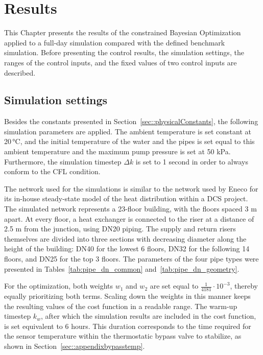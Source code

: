 \chapter{Results}
\label{chapter:Results}

This Chapter presents the results of the constrained Bayesian Optimization applied to a full-day simulation compared with the defined benchmark simulation. Before presenting the control results, the simulation settings, the ranges of the control inputs, and the fixed values of two control inputs are described.

\section{Simulation settings}
Besides the constants presented in Section~\ref{sec::physicalConstants}, the following simulation parameters are applied. The ambient temperature is set constant at 20\,°C, and the initial temperature of the water and the pipes is set equal to this ambient temperature and the maximum pump pressure is set at 50 kPa. Furthermore, the simulation timestep $\Delta k$ is set to 1 second in order to always conform to the CFL condition. 

The network used for the simulations is similar to the network used by Eneco for its in-house steady-state model of the heat distribution within a DCS project. The simulated network represents a 23-floor building, with the floors spaced 3 m apart. At every floor, a heat exchanger is connected to the riser at a distance of 2.5 m from the junction, using DN20 piping. The supply and return risers themselves are divided into three sections with decreasing diameter along the height of the building: DN40 for the lowest 6 floors, DN32 for the following 14 floors, and DN25 for the top 3 floors. The parameters of the four pipe types were presented in Tables~\ref{tab:pipe_dn_common} and~\ref{tab:pipe_dn_geometry}.

For the optimization, both weights $w_1$ and $w_2$ are set equal to 
$\frac{1}{4181} \cdot 10^{-3}$, thereby equally prioritizing both terms. Scaling down the weights in this manner keeps the resulting values of the cost function in a readable range. The warm-up timestep $k_w$, after which the simulation results are included in the cost function, is set equivalent to 6 hours. This duration corresponds to the time required for the sensor temperature within the thermostatic bypass valve to stabilize, as shown in Section~\ref{sec::appendixbypasstemp}.


